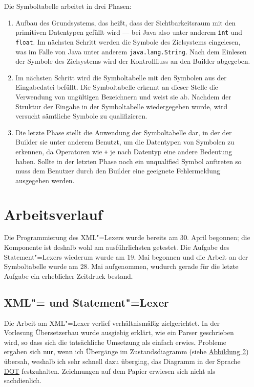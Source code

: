 \documentclass[10pt,a4paper,ngerman,titlepage,tocindentauto]{scrartcl}
\begin{document}
			Die Symboltabelle arbeitet in drei Phasen:
			\begin{enumerate}
				\item
					Aufbau des Grundsystems, das heißt, dass der Sichtbarkeitsraum mit den primitiven
					Datentypen gefüllt wird --- bei Java also unter anderem \texttt{int} und \texttt{float}.
					Im nächsten Schritt werden die Symbole des Zielsystems eingelesen, was im Falle von
					Java unter anderem \texttt{java.lang.String}. Nach dem Einlesen der Symbole des
					Zielsystems wird der Kontrollfluss an den Builder abgegeben.
				\item
					Im nächsten Schritt wird die Symboltabelle mit den Symbolen aus der Eingabedatei befüllt.
					Die Symboltabelle erkennt an dieser Stelle die Verwendung von ungültigen Bezeichnern und weist
					sie ab. Nachdem der Struktur der Eingabe in der Symboltabelle wiedergegeben wurde, wird versucht
					sämtliche Symbole zu qualifizieren.
				\item
					Die letzte Phase stellt die Anwendung der Symboltabelle dar, in der der Builder sie unter anderem
					Benutzt, um die Datentypen von Symbolen zu erkennen, da Operatoren wie \texttt + je nach Datentyp
					eine andere Bedeutung haben. Sollte in der letzten Phase noch ein unqualified Symbol auftreten
					so muss dem Benutzer durch den Builder eine geeignete Fehlermeldung ausgegeben werden.
			\end{enumerate}
	
	\section[Arbeitsverlauf]{\hypertarget{Arbeitsverlauf}{Arbeitsverlauf}}
		Die Programmierung des XML"=Lexers wurde bereits am 30. April begonnen; die Komponente ist deshalb
		wohl am ausführlichsten getestet. Die Aufgabe des Statement"=Lexers wiederum wurde
		am 19. Mai begonnen und die Arbeit an der Symboltabelle wurde am 28. Mai aufgenommen,
		wudurch gerade für die letzte Aufgabe ein erheblicher Zeitdruck bestand.
		
		\subsection{XML"= und Statement"=Lexer}
			Die Arbeit am XML"=Lexer verlief verhältnismäßig zielgerichtet. In der Vorlesung
			Übersetzerbau wurde ausgiebig erklärt, wie ein Parser geschrieben wird, so dass
			sich die tatsächliche Umsetzung als einfach erwies. Probleme ergaben sich nur,
			wenn ich Übergänge im Zustandsdiagramm (siehe \hyperlink{Uebergangsdiagramm_XML_Lexer}{Abbildung 2})
			übersah, weshalb ich sehr schnell dazu überging, das Diagramm in der Sprache
			\href{http://www.graphviz.org/doc/info/lang.html}{DOT} festzuhalten. Zeichnungen auf
			dem Papier erwiesen sich nicht als sachdienlich.
		
\end{document}
